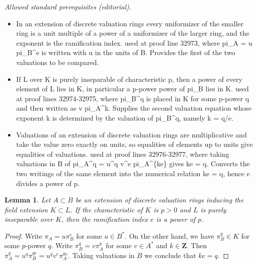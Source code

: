 \documentclass[10pt,a4paper]{amsart}
\theoremstyle{plain}
\newtheorem{lemma}[subsection]{Lemma}
\theoremstyle{definition}
\theoremstyle{remark}
\numberwithin{equation}{subsection}
\begin{document}
\noindent\textit{Allowed standard prerequisites (editorial).}\begin{itemize}
\item In an extension of discrete valuation rings every uniformizer of the smaller ring is a unit multiple of a power of a uniformizer of the larger ring, and the exponent is the ramification index. used at proof line 32973, where pi\_A = u pi\_B\textasciicircum{}e is written with u in the units of B. Provides the first of the two valuations to be compared.
\item If L over K is purely inseparable of characteristic p, then a power of every element of L lies in K, in particular a p-power power of pi\_B lies in K. used at proof lines 32974-32975, where pi\_B\textasciicircum{}q is placed in K for some p-power q and then written as v pi\_A\textasciicircum{}k. Supplies the second valuation equation whose exponent k is determined by the valuation of pi\_B\textasciicircum{}q, namely k = q/e.
\item Valuations of an extension of discrete valuation rings are multiplicative and take the value zero exactly on units, so equalities of elements up to units give equalities of valuations. used at proof lines 32976-32977, where taking valuations in B of pi\_A\textasciicircum{}q = u\textasciicircum{}q v\textasciicircum{}e pi\_A\textasciicircum{}\{ke\} gives ke = q. Converts the two writings of the same element into the numerical relation ke = q, hence e divides a power of p.
\end{itemize}\medskip
\begin{lemma}
\label{lemma-ramification-index-a-power-of-p}
Let $A \subset B$ be an extension of discrete valuation rings
inducing the field extension $K \subset L$. If the characteristic
of $K$ is $p > 0$ and $L$ is purely inseparable over $K$, then
the ramification index $e$ is a power of $p$.
\end{lemma}

\begin{proof}
Write $\pi_A = u \pi_B^e$ for some $u \in B^*$. On the other hand, we have
$\pi_B^q \in K$ for some $p$-power $q$. Write
$\pi_B^q = v \pi_A^k$ for some $v \in A^*$ and $k \in \mathbf{Z}$.
Then $\pi_A^q = u^q \pi_B^{qe} = u^q v^e \pi_A^{ke}$.
Taking valuations in $B$ we conclude that $ke = q$.
\end{proof}
\end{document}
